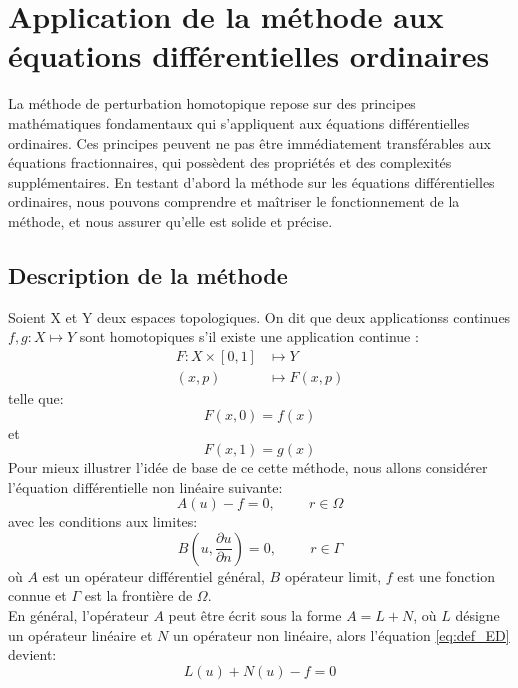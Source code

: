 \section{Application de la méthode aux équations différentielles ordinaires}
La méthode de perturbation homotopique repose sur des principes mathématiques fondamentaux qui s'appliquent aux équations différentielles ordinaires. Ces principes peuvent ne pas être immédiatement transférables aux équations fractionnaires, qui possèdent des propriétés et des complexités supplémentaires. En testant d'abord la méthode sur les équations différentielles ordinaires, nous pouvons comprendre et maîtriser le fonctionnement de la méthode, et nous assurer qu'elle est solide et précise. 
\subsection{Description de la méthode}
Soient X et Y deux espaces topologiques. On dit que deux applicationss continues $f,g:X\mapsto Y$ sont homotopiques s'il existe une application continue :
\begin{align*}
    F:X \times [0,1] & \mapsto Y \\
    (x,p) &\mapsto F(x,p)
\end{align*}
telle que:
\begin{equation*}
    F(x,0)=f(x)
\end{equation*}
et
\begin{equation*}
    F(x,1) = g(x)
\end{equation*}
Pour mieux illustrer l'idée de base de ce cette méthode, nous allons considérer l'équation différentielle non linéaire suivante:
\begin{equation} \label{eq:def_ED}
    A(u)-f=0, \hspace{1cm} r\in\Omega
\end{equation}
avec les conditions aux limites:
\begin{equation}
    B(u,\frac{\partial u}{\partial n}) = 0, \hspace{1cm} r\in \Gamma
\end{equation}
où $A$ est un opérateur différentiel général, $B$ opérateur limit, $f$ est une fonction connue et $\Gamma$ est la frontière de $\Omega$.\\
En général, l'opérateur $A$ peut être écrit sous la forme $A=L+N$, où $L $ désigne un opérateur linéaire et $N$ un opérateur non linéaire, alors l'équation \ref{eq:def_ED} devient: 
\begin{equation}
    L(u) + N(u) - f =0
\end{equation}
